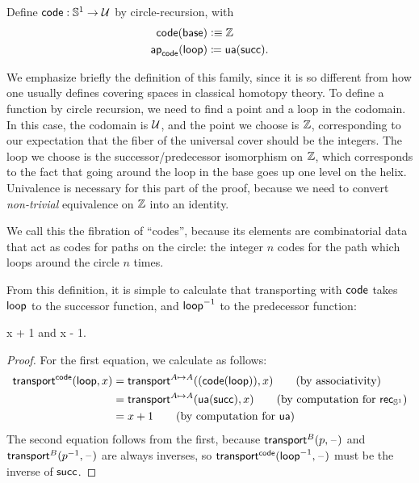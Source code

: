 \begin{defn} \label{S1-universal-cover}
  Define $\mathsf{code} : \mathbb{S} ^1 \to \mathcal{U}$ by circle-recursion, with 
  \begin{align*}
    \mathsf{code}(\mathsf{base}) &\vcentcolon\equiv \mathbb{Z} \\
    \mathsf{ap}_{\mathsf{code}}({\mathsf{loop}}) &\coloneqq \mathsf{ua}(\mathsf{succ}).
  \end{align*}
\end{defn}

We emphasize briefly the definition of this family, since it is so different from how one usually defines covering spaces in classical homotopy theory.
To define a function by circle recursion, we need to find a point and a
loop in the codomain.  In this case, the codomain is $\mathcal{U}$, and the point
we choose is $\mathbb{Z}$, corresponding to our expectation that the
fiber of the universal cover should be the integers.  The loop we choose
is the successor/predecessor
%
%
isomorphism on $\mathbb{Z}$, which
corresponds to the fact that going around the loop in the base goes up
one level on the helix.  Univalence is necessary for this part of the
proof, because we need to convert \emph{non-trivial} equivalence on $\mathbb{Z}$ into an identity.  

We call this the fibration of ``codes'', because its elements are combinatorial data that act as codes for paths on the circle: the integer $n$ codes for the path which loops around the circle $n$ times.

From this definition, it is simple to calculate that transporting with
$\mathsf{code}$ takes $\mathsf{loop}$ to the successor function, and 
$\mathord{{\mathsf{loop}}^{-1}}$ to the predecessor function:
\begin{lem} \label{lem:transport-s1-code}
 {x + 1} and 
 {x - 1}.
\end{lem}
\begin{proof}
For the first equation, we calculate as follows:
\begin{align}
{\transfib \code \lloop x} 
&= \transfib {A \mapsto A} {(\ap{\code}{\lloop})} x \tag{by associativity}\\
&= \transfib {A \mapsto A} {\ua (\Zsuc)} x \tag{by computation for $\rec{\Sn^1}$}\\
&= x + 1 \tag{by computation for \ua}
\end{align}
The second equation follows from the first, because $\mathsf{transport}^{B}(p,\mathord{\hspace{1pt}\text{--}\hspace{1pt}})$ and $\mathsf{transport}^{B}(\mathord{{p}^{-1}},\mathord{\hspace{1pt}\text{--}\hspace{1pt}})$ are always inverses, so $\mathsf{transport}^{\mathsf{code}}(\mathord{{\mathsf{loop}}^{-1}},\mathord{\hspace{1pt}\text{--}\hspace{1pt}})$ must be the inverse of $\mathsf{succ}$.
\end{proof}


